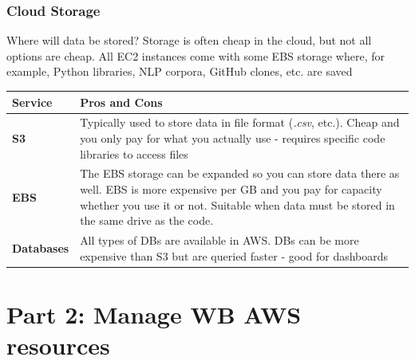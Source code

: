 \documentclass[aspectratio=169]{beamer} %
\begin{document}
\begin{frame}
	\frametitle{Cloud Storage}

	Where will data be stored? Storage is often cheap in the cloud,
	but not all options are cheap.
	All EC2 instances come with some EBS storage where,
	for example, Python libraries, NLP corpora,  GitHub clones, etc. are saved
	\vspace{-.5cm}
	\begin{table}
		\begin{tabular}{p{}p{}}
			Service & Pros and Cons\\
			\hline \hline
			\textbf{S3} & Typically used to store data in file format (\textit{.csv}, etc.).
			Cheap and you only pay for what you actually use
			- requires specific code libraries to access files\\[.2cm]
			\textbf{EBS} & The EBS storage can be expanded so you can store data there as well.
			EBS is more expensive per GB and you pay for capacity whether you use it or not.
			Suitable when data must be stored in the same drive as the code.\\[.2cm]
			\textbf{Databases} & All types of DBs are available in AWS.
			DBs can be more expensive than S3 but are queried faster
			- good for dashboards
		\end{tabular}
	\end{table}
\end{frame}

\section{Part 2: Manage WB AWS resources}
\end{document}
